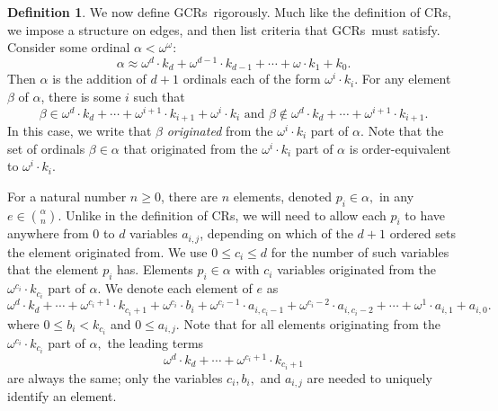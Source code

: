 \documentclass[10pt,a4paper]{article}
\newcommand{\om}{\omega}
\newcommand{\oequiv}{\approx}
\newcommand{\crulenospace}{CR}
\newcommand{\crulesnospace}{\crulenospace s}
\newcommand{\gencrulenospace}{GCR}
\newcommand{\gencrules}{\gencrulenospace s~}
\newcommand{\numpoints}{n}
\newcommand{\inumpoints}{i}
\newcommand{\idegr}{j}
\newcommand{\commonconst}{a}
\newcommand{\rareconst}{b}
\theoremstyle{plain}
\theoremstyle{definition}
\newtheorem{definition}[theorem]{Definition}
\begin{document}
\begin{definition}
\label{def:SC} We now define \gencrules rigorously. Much like the definition of \crulesnospace, we impose a structure on edges, and then list criteria that \gencrules must satisfy.
Consider some ordinal $\alpha < \om^\om$:
$$\alpha \oequiv \om^d \cdot k_d + \om^{d-1}\cdot k_{d-1} + \cdots + \om \cdot k_1 + k_0.$$
Then $\alpha$ is the addition of $d+1$ ordinals each of the form $\om^\inumpoints\cdot k_\inumpoints$. 
For any element $\beta$ of $\alpha$, there is some $\inumpoints$ such that $$
\beta \in  \om^d \cdot k_d + \cdots + \om^{\inumpoints+1} \cdot k_{\inumpoints+1} + \om^{\inumpoints} \cdot k_{\inumpoints} \text{ and } \beta \not \in \om^d \cdot k_d + \cdots + \om^{\inumpoints+1} \cdot k_{\inumpoints+1}.
$$
In this case, we write that
$\beta$ {\it originated} from the $\om^{\inumpoints} \cdot k_{\inumpoints}$ part of $\alpha$. Note that the set of ordinals $\beta \in \alpha$ that originated from the $\om^{\inumpoints} \cdot k_{\inumpoints}$ part of $\alpha$ is order-equivalent to $\om^{\inumpoints} \cdot k_{\inumpoints}.$

For a natural number
$\numpoints\geq 0$, there are $\numpoints$ elements, denoted $p_\inumpoints \in \alpha,$
in any
$e \in \binom{\alpha}{\numpoints}$. Unlike in the definition of \crulesnospace, we will need to allow each $p_i$ to
have anywhere from 0 to $d$ variables $\commonconst_{\inumpoints,\idegr}$, depending on which of the $d+1$ ordered sets the element originated from. We use
$0 \leq c_{\inumpoints} \leq d$ for the 
number of such variables that the element $p_\inumpoints$ has.
Elements $p_\inumpoints \in \alpha$ with $c_{\inumpoints}$ variables
originated from the $\om^{c_{\inumpoints}} \cdot k_{c_{\inumpoints}}$ part of $\alpha$. We denote each element of $e$ as 
$$
\om^d \cdot k_d + \cdots + \om^{c_{\inumpoints}+1} \cdot k_{c_{\inumpoints}+1} + \om^{c_{\inumpoints}} \cdot \rareconst_{\inumpoints} + \om^{c_{\inumpoints}-1} \cdot \commonconst_{\inumpoints,c_{\inumpoints}-1} + \om^{c_{\inumpoints}-2} \cdot \commonconst_{\inumpoints,c_{\inumpoints}-2} + \cdots + \om^1 \cdot \commonconst_{\inumpoints,1} + \commonconst_{\inumpoints,0}.$$ where $0 \leq \rareconst_{\inumpoints} < k_{c_{\inumpoints}}$ and $0\leq \commonconst_{\inumpoints,\idegr}$. Note that for all elements originating from the $\om^{c_{\inumpoints}} \cdot k_{c_{\inumpoints}}$ part of $\alpha,$ the leading terms $$\om^d \cdot k_d + \cdots + \om^{c_{\inumpoints}+1} \cdot k_{c_{\inumpoints}+1}$$ are always the same; only the variables $c_{\inumpoints}, \rareconst_{\inumpoints},$ and $\commonconst_{\inumpoints,\idegr}$ are needed to uniquely identify an element.


\end{definition}
\end{document}
